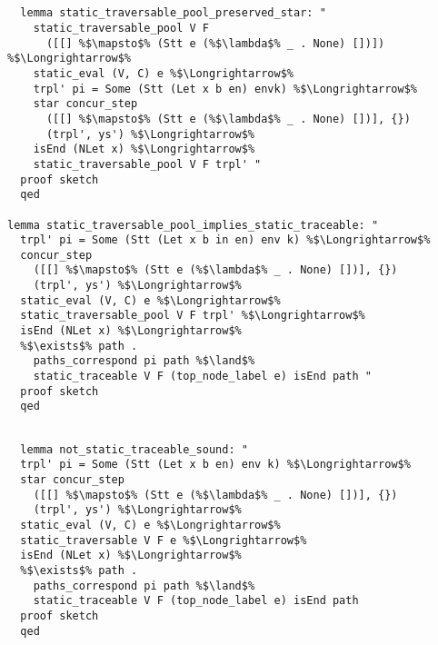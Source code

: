 \documentclass{article}
\begin{document}
\begin{lstlisting}[style=codestyle1, escapechar=\%]


  lemma static_traversable_pool_preserved_star: "
    static_traversable_pool V F
      ([[] %$\mapsto$% (Stt e (%$\lambda$% _ . None) [])]) %$\Longrightarrow$%
    static_eval (V, C) e %$\Longrightarrow$%
    trpl' pi = Some (Stt (Let x b en) envk) %$\Longrightarrow$%
    star concur_step
      ([[] %$\mapsto$% (Stt e (%$\lambda$% _ . None) [])], {})
      (trpl', ys') %$\Longrightarrow$%
    isEnd (NLet x) %$\Longrightarrow$%
    static_traversable_pool V F trpl' "
  proof sketch
  qed

lemma static_traversable_pool_implies_static_traceable: "
  trpl' pi = Some (Stt (Let x b in en) env k) %$\Longrightarrow$%
  concur_step
    ([[] %$\mapsto$% (Stt e (%$\lambda$% _ . None) [])], {})
    (trpl', ys') %$\Longrightarrow$% 
  static_eval (V, C) e %$\Longrightarrow$%
  static_traversable_pool V F trpl' %$\Longrightarrow$%
  isEnd (NLet x) %$\Longrightarrow$%
  %$\exists$% path . 
    paths_correspond pi path %$\land$%
    static_traceable V F (top_node_label e) isEnd path "
  proof sketch
  qed
  \end{lstlisting}


\begin{lstlisting}[style=codestyle1, escapechar=\%]

  lemma not_static_traceable_sound: "
  trpl' pi = Some (Stt (Let x b en) env k) %$\Longrightarrow$%
  star concur_step
    ([[] %$\mapsto$% (Stt e (%$\lambda$% _ . None) [])], {})
    (trpl', ys') %$\Longrightarrow$% 
  static_eval (V, C) e %$\Longrightarrow$%
  static_traversable V F e %$\Longrightarrow$%
  isEnd (NLet x) %$\Longrightarrow$%
  %$\exists$% path . 
    paths_correspond pi path %$\land$%
    static_traceable V F (top_node_label e) isEnd path
  proof sketch
  qed
  \end{lstlisting}
\end{document}
